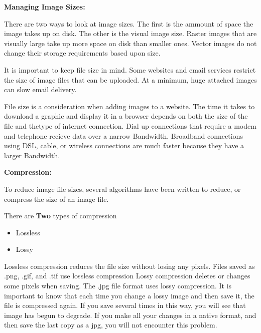 \documentclass{report}
\begin{document}
    \pagebreak
    \begin{Large}
        \noindent \textbf{Managing Image Sizes:}       
    \end{Large} 

    \bigbreak \noindent 
    There are two ways to look at image sizes. The first is the ammount of space the 
    image takes up on disk. The other is the visual image size. Raster images that are 
    visually large take up more space on disk than smaller ones. Vector images
    do not change their storage requirements based upon size.

    \bigbreak \noindent 
    It is important to keep file size in mind. Some websites and email services restrict the size of image files that can be uploaded.
    At a minimum, huge attached images can slow email delivery. 

    \bigbreak \noindent 
    File size is a consideration when adding images to a website. The time it takes 
    to download a graphic and display it in a browser depends on both the size of the file and thetype of 
    internet connection. Dial up connections that require a modem and telephone
    recieve data over a narrow Bandwidth. Broadband connections using DSL, cable, or wireless
    connections are much faster because they have a larger Bandwidth.

    \bigbreak \noindent \bigbreak \noindent 
    \begin{Large}
        \textbf{Compression:}
    \end{Large}

    \bigbreak \noindent 
    To reduce image file sizes, several algorithms have been written to reduce, or compress 
    the size of an image file. 

    \bigbreak \noindent 
    There are \textbf{Two} types of compression
    \begin{itemize}
        \item Lossless
        \item Lossy
    \end{itemize}

    \bigbreak \noindent 
    Lossless compression reduces the file size without losing any pixels. Files saved as .png, .gif, and .tif
    use lossless compression
    \bigbreak \noindent 
    Lossy compression deletes or changes some pixels when saving. The .jpg file format uses 
    lossy compression. It is important to know that each time you change a lossy image 
    and then save it, the file is compressed again. If you save several times in this way, 
    you will see that image has begun to degrade. If you make all your changes in a native format, 
    and then save the last copy as a jpg, you will not encounter this problem. 
\end{document}
